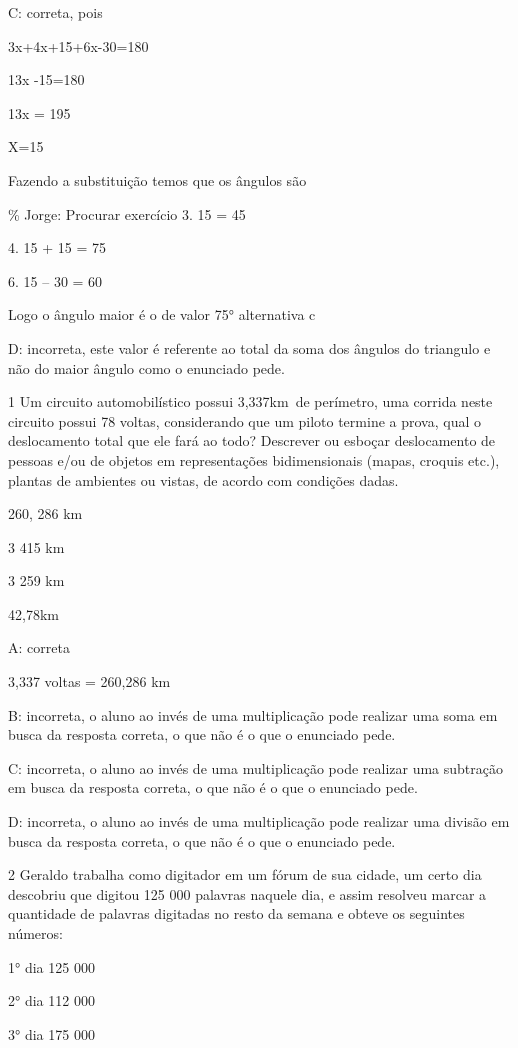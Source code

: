 C: correta, pois

3x+4x+15+6x-30=180

13x -15=180

13x = 195

X=15

Fazendo a substituição temos que os ângulos são

\% Jorge: Procurar exercício 3. 15 = 45

4. 15 + 15 = 75

6. 15 -- 30 = 60

Logo o ângulo maior é o de valor 75° alternativa c

D: incorreta, este valor é referente ao total da soma dos ângulos do
triangulo e não do maior ângulo como o enunciado pede.

\num{1} Um circuito automobilístico possui 3,337km~de perímetro, uma corrida
neste circuito possui 78 voltas, considerando que um piloto termine a
prova, qual o deslocamento total que ele fará ao todo? Descrever ou
esboçar deslocamento de pessoas e/ou de objetos em representações
bidimensionais (mapas, croquis etc.), plantas de ambientes ou vistas, de
acordo com condições dadas.

\item 260, 286 km
\item 3 415 km
\item 3 259 km
\item 42,78km

A: correta

3,337 voltas = 260,286 km

B: incorreta, o aluno ao invés de uma multiplicação pode realizar uma
soma em busca da resposta correta, o que não é o que o enunciado pede.

C: incorreta, o aluno ao invés de uma multiplicação pode realizar uma
subtração em busca da resposta correta, o que não é o que o enunciado
pede.

D: incorreta, o aluno ao invés de uma multiplicação pode realizar uma
divisão em busca da resposta correta, o que não é o que o enunciado
pede.

\num{2} Geraldo trabalha como digitador em um fórum de sua cidade, um certo
dia descobriu que digitou 125 000 palavras naquele dia, e assim resolveu
marcar a quantidade de palavras digitadas no resto da semana e obteve os
seguintes números:

1° dia 125 000

2° dia 112 000

3° dia 175 000

